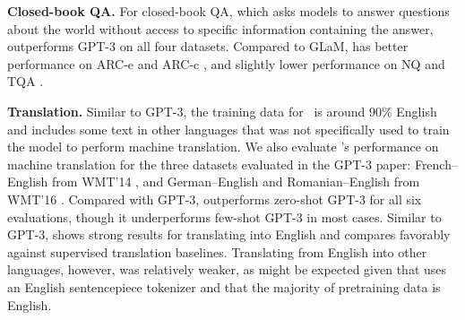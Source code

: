 \textbf{Closed-book QA.}
For closed-book QA, which asks models to answer questions about the world without access to specific information containing the answer, \flan{} outperforms GPT-3 on all four datasets.
Compared to GLaM, \flan{} has better performance on ARC-e and ARC-c \citep{clark2018think}, and slightly lower performance on NQ \citep{orqa,kwiatkowski2019natural} and TQA \citep{JoshiTriviaQA2017}.

\textbf{Translation.}
Similar to GPT-3, the training data for \baselm\ is around 90\% English and includes some text in other languages that was not specifically used to train the model to perform machine translation. 
We also evaluate \flan's performance on machine translation for the three datasets evaluated in the GPT-3 paper: French--English from WMT'14 \citep{wmt14}, and German--English and Romanian--English from WMT'16 \citep{wmt16}. 
Compared with GPT-3, \flan{} outperforms zero-shot GPT-3 for all six evaluations, though it underperforms few-shot GPT-3 in most cases.
Similar to GPT-3, \flan{} shows strong results for translating into English and compares favorably against supervised translation baselines.
Translating from English into other languages, however, was relatively weaker, as might be expected given that \flan{} uses an English sentencepiece tokenizer and that the majority of pretraining data is English.
 

\newcommand{\flanvalspaced}[4]{
\makecell[l]{\hspace{#4mm}#1\vspace{-1.5mm}\\
{\hspace{#4mm}\battleshipgrey{\tiny std=#2}}\vspace{0.3mm}\\
\hspace{#4mm}{#3}}}
\newcommand{\flanval}[3]{\flanvalspaced{#1}{#2}{#3}{0}}

\newcommand{\gptvalspaced}[4]{\makecell[l]{\hspace{#4mm}#1\vspace{-0.4mm}\\{\hspace{#4mm}\battleshipgrey{\scriptsize #3}}}}
\newcommand{\gptval}[3]{\gptvalspaced{#1}{#2}{#3}{0}}

